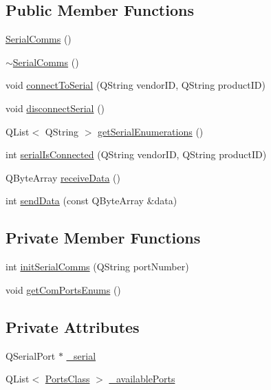 \subsection*{Public Member Functions}
\begin{DoxyCompactItemize}
\item 
\mbox{\hyperlink{classSerialComms_a0a40e994d9726ef0df2e109942c24017}{Serial\+Comms}} ()
\item 
\mbox{\hyperlink{classSerialComms_a895edf0d156be20f30422969ee30b20f}{$\sim$\+Serial\+Comms}} ()
\item 
void \mbox{\hyperlink{classSerialComms_a4488e53e2a6693ad72759eff9862ac37}{connect\+To\+Serial}} (Q\+String vendor\+ID, Q\+String product\+ID)
\item 
void \mbox{\hyperlink{classSerialComms_a437fbaf140deae42fa64d914f8d13ec8}{disconnect\+Serial}} ()
\item 
Q\+List$<$ Q\+String $>$ \mbox{\hyperlink{classSerialComms_ab11ec2f342fc8543e7974a843fad67dd}{get\+Serial\+Enumerations}} ()
\item 
int \mbox{\hyperlink{classSerialComms_ad9980837a7d0672d100b0b83e3e47451}{serial\+Is\+Connected}} (Q\+String vendor\+ID, Q\+String product\+ID)
\item 
Q\+Byte\+Array \mbox{\hyperlink{classSerialComms_a27213be37d69250aaedc5c861c2d2200}{receive\+Data}} ()
\item 
int \mbox{\hyperlink{classSerialComms_abcbc3cce26ff395684de26a07da7ca26}{send\+Data}} (const Q\+Byte\+Array \&data)
\end{DoxyCompactItemize}
\subsection*{Private Member Functions}
\begin{DoxyCompactItemize}
\item 
int \mbox{\hyperlink{classSerialComms_aacd1dbe02e7eee87c7d75fc2049e71f4}{init\+Serial\+Comms}} (Q\+String port\+Number)
\item 
void \mbox{\hyperlink{classSerialComms_acea35603a9438747302b04f0b0a81312}{get\+Com\+Ports\+Enums}} ()
\end{DoxyCompactItemize}
\subsection*{Private Attributes}
\begin{DoxyCompactItemize}
\item 
Q\+Serial\+Port $\ast$ \mbox{\hyperlink{classSerialComms_a0f5a6dcd2bcf9c0b6cd6e60bbad4240e}{\+\_\+serial}}
\item 
Q\+List$<$ \mbox{\hyperlink{classPortsClass}{Ports\+Class}} $>$ \mbox{\hyperlink{classSerialComms_aed2175e6fe3d3c62e8f0b12333c7b650}{\+\_\+available\+Ports}}
\end{DoxyCompactItemize}


